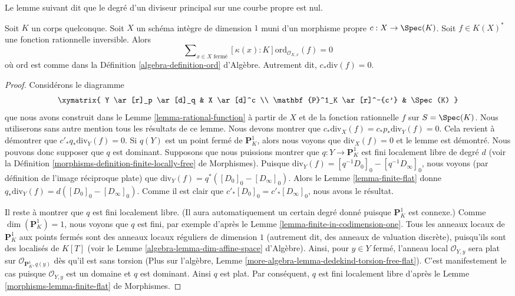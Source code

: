 \noindent
Le lemme suivant dit que le degré d'un diviseur principal sur
une courbe propre est nul.

\begin{lemma}
\label{lemma-curve-principal-divisor}
Soit $K$ un corps quelconque. Soit $X$ un schéma intègre de dimension $1$
muni d'un morphisme propre $c : X \to \Spec(K)$.
Soit $f \in K(X)^*$ une fonction rationnelle inversible.
Alors
$$
\sum\nolimits_{x \in X \text{ fermé}}
[\kappa(x) : K] \text{ord}_{\mathcal{O}_{X, x}}(f)
=
0
$$
où $\text{ord}$ est comme dans la
Définition \ref{algebra-definition-ord} d'Algèbre.
Autrement dit, $c_*\text{div}(f) = 0$.
\end{lemma}

\begin{proof}
Considérons le diagramme
$$
\xymatrix{
Y \ar[r]_p \ar[d]_q & X \ar[d]^c \\
\mathbf{P}^1_K \ar[r]^-{c'} & \Spec(K)
}
$$
que nous avons construit dans le Lemme \ref{lemma-rational-function}
à partir de $X$ et de la fonction rationnelle $f$ sur $S = \Spec(K)$.
Nous utiliserons sans autre mention tous les résultats de ce lemme.
Nous devons montrer que $c_*\text{div}_X(f) = c_*p_*\text{div}_Y(f) = 0$.
Cela revient à démontrer que $c'_*q_*\text{div}_Y(f) = 0$.
Si $q(Y)$ est un point fermé de $\mathbf{P}^1_K$, alors nous
voyons que $\text{div}_X(f) = 0$ et le lemme est démontré.
Nous pouvons donc supposer que $q$ est dominant.
Supposons que nous puissions montrer que $q : Y \to \mathbf{P}^1_K$ est fini
localement libre de degré $d$ (voir la
Définition \ref{morphisms-definition-finite-locally-free} de Morphismes).
Puisque $\text{div}_Y(f) = [q^{-1}D_0]_0 - [q^{-1}D_\infty]_0$,
nous voyons (par définition de l'image réciproque plate) que
$\text{div}_Y(f) = q^*([D_0]_0 - [D_\infty]_0)$.
Alors le Lemme \ref{lemma-finite-flat} donne
$q_*\text{div}_Y(f) = d([D_0]_0 - [D_\infty]_0)$.
Comme il est clair que $c'_*[D_0]_0 = c'_*[D_\infty]_0$, nous avons le résultat.

\medskip\noindent
Il reste à montrer que $q$ est fini localement libre.
(Il aura automatiquement un certain degré donné puisque $\mathbf{P}^1_K$
est connexe.)
Comme $\dim(\mathbf{P}^1_K) = 1$, nous voyons que $q$ est fini, par exemple
d'après le Lemme \ref{lemma-finite-in-codimension-one}.
Tous les anneaux locaux de $\mathbf{P}^1_K$ aux
points fermés sont des anneaux locaux réguliers de dimension $1$
(autrement dit, des anneaux de valuation discrète), puisqu'ils sont des
localisés de $K[T]$ (voir le
Lemme \ref{algebra-lemma-dim-affine-space} d'Algèbre).
Ainsi, pour $y\in Y$ fermé, l'anneau local $\mathcal{O}_{Y, y}$
sera plat sur $\mathcal{O}_{\mathbf{P}^1_K, q(y)}$ dès qu'il est
sans torsion (Plus sur l'algèbre, Lemme
\ref{more-algebra-lemma-dedekind-torsion-free-flat}).
C'est manifestement le cas puisque
$\mathcal{O}_{Y, y}$ est un domaine et $q$ est dominant.
Ainsi $q$ est plat. Par conséquent, $q$ est fini localement libre d'après le
Lemme \ref{morphisms-lemma-finite-flat} de Morphismes.
\end{proof}





